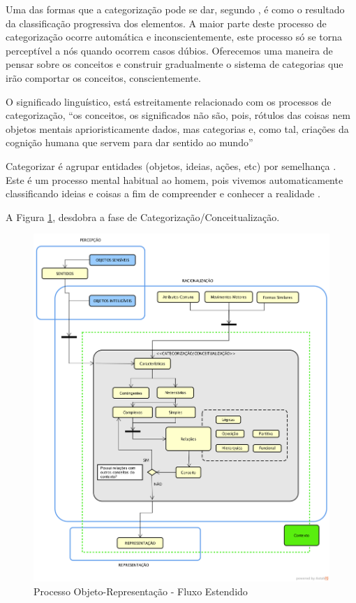 Uma das formas que a categorização pode se dar, segundo \citet{richardson:1985.pesquisa}, é como o resultado da classificação progressiva dos elementos. A maior parte deste processo de categorização ocorre automática e inconscientemente, este processo só se torna perceptível a nós quando ocorrem casos dúbios. Oferecemos uma maneira de pensar sobre os conceitos e construir gradualmente o sistema de categorias que irão comportar os conceitos, conscientemente.

O significado linguístico, está estreitamente relacionado com os processos de categorização, ``os conceitos, os significados não são, pois, rótulos das coisas nem objetos mentais aprioristicamente dados, mas categorias e, como tal, criações da cognição humana que servem para dar sentido ao mundo” \citep[p. 298]{da:2006.mundo}

Categorizar é agrupar entidades (objetos, ideias, ações, etc) por semelhança \citep{lima:2007.categorizacao}. Este é um processo mental habitual ao homem, pois vivemos automaticamente classificando ideias e coisas a fim de compreender e conhecer a realidade \cite{piedade:1983.introducao}.

A Figura \ref{fig:por-estendido}, desdobra a fase de Categorização/Conceitualização.

\begin{figure}
    \centering
    \includegraphics[width=\textwidth]{imagens/Processo_O-R_Estendido_2.png}
    \caption{Processo Objeto-Representação - Fluxo Estendido}
    \label{fig:por-estendido}
\end{figure}

